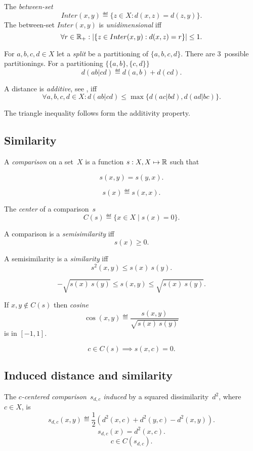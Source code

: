\documentclass[10pt,a4paper]{article}
\theoremstyle{plain} \newtheorem{Lem}{Lemma}
\begin{document}
The {\em between-set}
$$ Inter(x,y) \eqdef \{z \in X: d(x,z) = d(z,y)\}. $$
The between-set $Inter(x,y)$ is {\em unidimensional} iff
$$ \forall r \in \mathbb R_+ : |\{z \in Inter(x,y): d(x,z) = r\}| \le 1. $$

For $a,b,c,d \in X$ let a {\em split} be a partitioning of $\{a,b,c,d\}$.
There are 3~possible partitionings.
For a partitioning $\{\{a,b\},\{c,d\}\}$
$$ d(ab|cd) \eqdef d(a,b) + d(cd). $$

A distance is {\em additive}, see \cite{Buneman}, iff
\begin{equation} \tag{additivity}
\forall a,b,c,d \in X : d(ab|cd) \le \max \{d(ac|bd), d(ad|bc)\}.
\end{equation}

The triangle inequality follows form the additivity property.


\subsection{Similarity}

A {\em comparison} on a set~$X$ is a function $s:X,X \mapsto \mathbb R$ such that

$$ s(x,y) = s(y,x). $$

$$ s(x) \eqdef s(x,x). $$

The {\em center} of a comparison~$s$
$$ C(s) \eqdef \{x \in X \mid s(x) = 0\}. $$

A comparison is a {\em semisimilarity} iff
$$ s(x) \ge 0. $$

A semisimilarity is a {\em similarity} iff
\begin{equation} \tag{H\"older's inequality}
  s^2(x,y) \le s(x) \ s(y) .
\end{equation}

$$ - \sqrt {s(x) \ s(y)} \le s(x,y) \le \sqrt {s(x) \ s(y)}. $$

If $x, y \not \in C(s)$ then {\em cosine}
$$ \cos(x,y) \eqdef \frac {s(x,y)} {\sqrt{s(x) \ s(y)}} $$
is in $[-1,1]$.

$$ c \in C(s) \implies s(x,c) = 0. $$


\subsection{Induced distance and similarity}

The {\em $c$-centered comparison~$s_{d,c}$ induced} by a squared dissimilarity~$d^2$, where $c \in X$, is
$$ s_{d,c}(x,y) \eqdef \frac 1 2 \left(d^2(x,c) + d^2(y,c) - d^2(x,y) \right). $$
$$ s_{d,c}(x) = d^2(x,c). $$
$$ c \in C(s_{d,c}). $$
\end{document}
